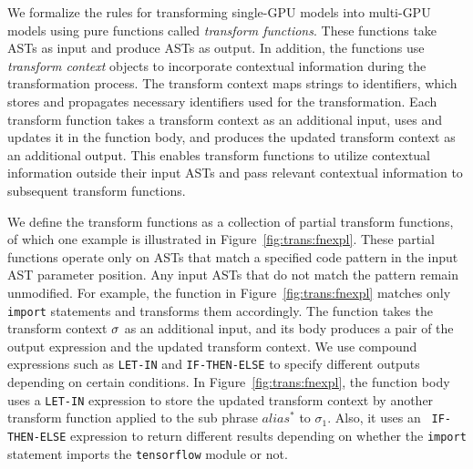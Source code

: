 We formalize the rules for transforming single-GPU models into multi-GPU
models using pure functions called {\it transform functions}. 
These functions take ASTs as input and produce ASTs as output. 
In addition, the functions use {\it transform context} objects to incorporate
contextual information during the transformation process. 
The transform context maps strings to identifiers, which stores and
propagates necessary identifiers used for the transformation.
Each transform function takes a transform context as an additional input, uses
and updates it in the function body, and produces the updated transform context
as an additional output.
This enables transform functions to utilize contextual information outside
their input ASTs and pass relevant contextual information to subsequent
transform functions.

We define the transform functions as a collection of partial transform
functions, of which one example is illustrated in
Figure~\ref{fig:trans:fnexpl}. 
These partial functions operate only on ASTs that match a specified code
pattern in the input AST parameter position. 
Any input ASTs that do not match the pattern remain unmodified. 
For example, the function in Figure~\ref{fig:trans:fnexpl} matches only {\tt
import} statements and transforms them accordingly. 
The function takes the transform context $\sigma$ as an additional input, and
its body produces a pair of the output expression and the updated transform
context. 
We use compound expressions such as {\tt LET-IN} and {\tt IF-THEN-ELSE} to
specify different outputs depending on certain conditions. 
In Figure~\ref{fig:trans:fnexpl}, the function body uses a {\tt LET-IN}
expression to store the updated transform context by another transform function
applied to the sub phrase $alias^*$ to $\sigma_1$. 
Also, it uses an {\tt
IF-THEN-ELSE} expression to return different results depending on whether the
{\tt import} statement imports the {\tt tensorflow} module or not.

